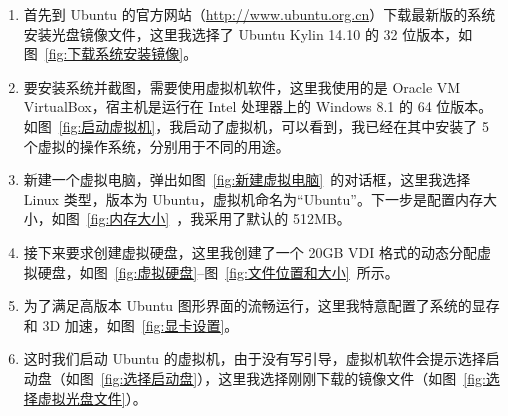 \documentclass[cs4size,a4paper,nofonts]{ctexart}
\begin{document}
\begin{enumerate}

\item 首先到 Ubuntu 的官方网站（\url{http://www.ubuntu.org.cn}）下载最新版的系统安装光盘镜像文件，这里我选择了 Ubuntu Kylin 14.10 的 32 位版本，如图~\ref{fig:下载系统安装镜像}。

\item 要安装系统并截图，需要使用虚拟机软件，这里我使用的是 Oracle VM VirtualBox，宿主机是运行在 Intel 处理器上的 Windows 8.1 的 64 位版本。如图~\ref{fig:启动虚拟机}，我启动了虚拟机，可以看到，我已经在其中安装了 5 个虚拟的操作系统，分别用于不同的用途。

\begin{figure}[htp]
\end{figure}

\item 新建一个虚拟电脑，弹出如图~\ref{fig:新建虚拟电脑}~的对话框，这里我选择 Linux 类型，版本为 Ubuntu，虚拟机命名为“Ubuntu”。下一步是配置内存大小，如图~\ref{fig:内存大小}~，我采用了默认的 512MB。

\begin{figure}[htp]
\end{figure}

\item 接下来要求创建虚拟硬盘，这里我创建了一个 20GB VDI 格式的动态分配虚拟硬盘，如图~\ref{fig:虚拟硬盘}--图~\ref{fig:文件位置和大小}~所示。

\begin{figure}[htp]
\end{figure}

\begin{figure}[htp]
\end{figure}

\item 为了满足高版本 Ubuntu 图形界面的流畅运行，这里我特意配置了系统的显存和 3D 加速，如图~\ref{fig:显卡设置}。

\item 这时我们启动 Ubuntu 的虚拟机，由于没有写引导，虚拟机软件会提示选择启动盘（如图~\ref{fig:选择启动盘}），这里我选择刚刚下载的镜像文件（如图~\ref{fig:选择虚拟光盘文件}）。


\end{enumerate}
\end{document}
